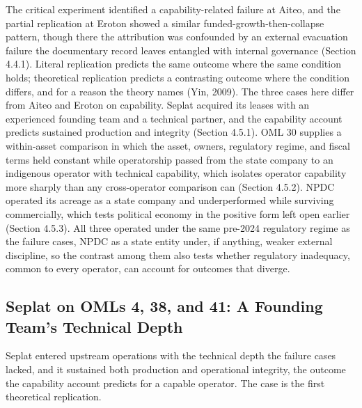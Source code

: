 The critical experiment identified a capability-related failure at
Aiteo, and the partial replication at Eroton showed a similar
funded-growth-then-collapse pattern, though there the attribution was
confounded by an external evacuation failure the documentary record
leaves entangled with internal governance (Section 4.4.1). Literal
replication predicts the same outcome where the same condition holds;
theoretical replication predicts a contrasting outcome where the
condition differs, and for a reason the theory names (Yin, 2009). The
three cases here differ from Aiteo and Eroton on capability. Seplat
acquired its leases with an experienced founding team and a technical
partner, and the capability account predicts sustained production and
integrity (Section 4.5.1). OML 30 supplies a within-asset comparison in
which the asset, owners, regulatory regime, and fiscal terms held
constant while operatorship passed from the state company to an
indigenous operator with technical capability, which isolates operator
capability more sharply than any cross-operator comparison can (Section
4.5.2). NPDC operated its acreage as a state company and underperformed
while surviving commercially, which tests political economy in the
positive form left open earlier (Section 4.5.3). All three operated
under the same pre-2024 regulatory regime as the failure cases, NPDC as
a state entity under, if anything, weaker external discipline, so the
contrast among them also tests whether regulatory inadequacy, common to
every operator, can account for outcomes that diverge.

\hypertarget{seplat-on-omls-4-38-and-41-a-founding-teams-technical-depth}{%
\subsection{Seplat on OMLs 4, 38, and 41: A Founding Team's Technical
Depth}\label{seplat-on-omls-4-38-and-41-a-founding-teams-technical-depth}}

Seplat entered upstream operations with the technical depth the failure
cases lacked, and it sustained both production and operational
integrity, the outcome the capability account predicts for a capable
operator. The case is the first theoretical replication.

